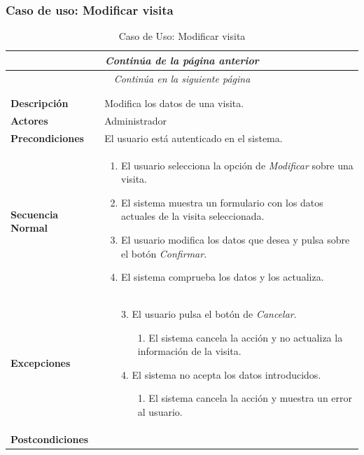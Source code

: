 \newpage
\subsubsection*{Caso de uso: Modificar visita }
\begin{longtable}{| p{4cm} | p{10cm} |}
\endfirsthead
\multicolumn{2}{c}{\textit{Continúa de la página anterior}}\\[12pt]
\hline
\endhead
\hline
\multicolumn{2}{c}{\textit{Continúa en la siguiente página}} \\
\endfoot
\hline
\caption{Caso de Uso: Modificar visita}\label{fig:1}\\
\endlastfoot


\hline
\multicolumn{2}{|c|}{\textbf{CU$<$32$>$ - Modificar Visita}} \\

\hline
\textbf{Descripción} &
Modifica los datos de una visita.\\

\hline
\textbf{Actores} &
Administrador\\

\hline
\textbf{Precondiciones} &
El usuario está autenticado en el sistema.\\

\hline
\textbf{Secuencia Normal} &\mbox{}\par\vspace{-\baselineskip}
\begin{enumerate}[leftmargin=0.7cm, topsep=0.1cm]
\item El usuario selecciona la opción de \textit{Modificar} sobre una visita.
\item El sistema muestra un formulario con los datos actuales de la visita seleccionada.
\item El usuario modifica los datos que desea y pulsa sobre el botón \textit{Confirmar}.
\item El sistema comprueba los datos y los actualiza.
\end{enumerate}


\\
\hline
\textbf{Excepciones} &\mbox{}\par\vspace{-\baselineskip}
\begin{enumerate}[leftmargin=0.9cm, topsep=0.1cm]
\item[3.] El usuario pulsa el botón de \textit{Cancelar}.
	\begin{itemize}
	\item[1.] El sistema cancela la acción y no actualiza la información de la visita.
	\end{itemize}
\item[4.] El sistema no acepta los datos introducidos.
	\begin{itemize}
	\item[1.] El sistema cancela la acción y muestra un error al usuario.
	\end{itemize}
\end{enumerate}
\\

\hline
\textbf{Postcondiciones} & \\
\hline
\end{longtable}



